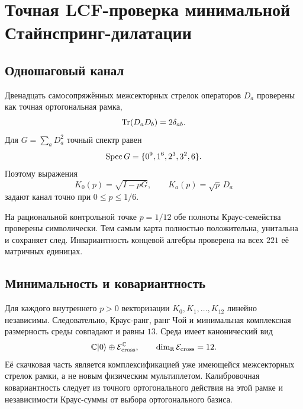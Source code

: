 \chapter{Точная LCF-проверка минимальной Стайнспринг-дилатации}
\label{ch:v8-minimal-covariant-stinespring-lcf-migration-gate}

\section{Одношаговый канал}

Двенадцать самосопряжённых межсекторных стрелок операторов $D_a$ проверены как
точная ортогональная рамка,
\begin{equation}
 \operatorname{Tr}(D_aD_b)=2\delta_{ab}.
\end{equation}
Для $G=\sum_aD_a^2$ точный спектр равен
\begin{equation}
 \operatorname{Spec} G=\{0^9,1^6,2^3,3^2,6\}.
 \label{eq:v8-lcf-stinespring-gram-spectrum}
\end{equation}
Поэтому выражения
\begin{equation}
 K_0(p)=\sqrt{I-pG},\qquad K_a(p)=\sqrt p\,D_a
 \label{eq:v8-lcf-stinespring-kraus-family}
\end{equation}
задают канал точно при $0\le p\le1/6$.

На рациональной контрольной точке $p=1/12$ обе полноты Краус-семейства
проверены символически. Тем самым карта полностью положительна, унитальна и
сохраняет след. Инвариантность концевой алгебры проверена на всех $221$
её матричных единицах.

\section{Минимальность и ковариантность}

Для каждого внутреннего $p>0$ векторизации $K_0,K_1,\ldots,K_{12}$ линейно
независимы. Следовательно, Краус-ранг, ранг Чой и минимальная комплексная
размерность среды совпадают и равны $13$. Среда имеет канонический вид
\begin{equation}
 \mathbb C\lvert0\rangle\oplus\mathcal E_{\rm cross}^{\mathbb C},
 \qquad \dim_{\mathbb R}\mathcal E_{\rm cross}=12.
\end{equation}
Её скачковая часть является комплексификацией уже имеющейся межсекторных стрелок рамки,
а не новым физическим мультиплетом. Калибровочная ковариантность следует из
точного ортогонального действия на этой рамке и независимости Краус-суммы
от выбора ортогонального базиса.


